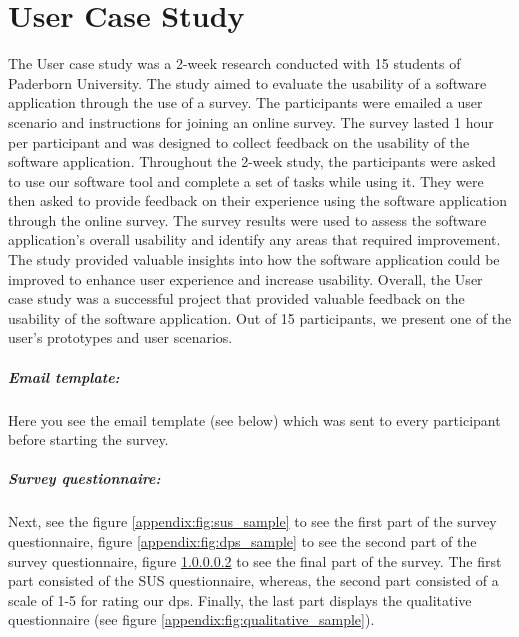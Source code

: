 \chapter{User Case Study}
\label{appendix:three:caseStudy}

\ifpdf
    \graphicspath{{Appendix3/Figs/}{Appendix3/Figs/}{Appendix3/Figs/}}
\else
    \graphicspath{{Appendix3/Figs/}{Appendix3/Figs/}}
\fi

The User case study was a 2-week research conducted with 15 students of Paderborn University. 
The study aimed to evaluate the usability of a software application through the use of a survey.
The participants were emailed a user scenario and instructions for joining an online survey. 
The survey lasted 1 hour per participant and was designed to collect feedback on the usability of the software application.
Throughout the 2-week study, the participants were asked to use our software tool and complete a set of tasks while using it. 
They were then asked to provide feedback on their experience using the software application through the online survey.
The survey results were used to assess the software application's overall usability and identify any areas that required improvement. 
The study provided valuable insights into how the software application could be improved to enhance user experience and increase usability. 
Overall, the User case study was a successful project that provided valuable feedback on the usability of the software application.
Out of 15 participants, we present one of the user's prototypes and user scenarios.

\paragraph{Email template:} Here you see the email template (see below) which was sent to every participant before starting the survey.

\paragraph{Survey questionnaire:} Next, see the figure \ref{appendix:fig:sus_sample} to see the first part of the survey questionnaire, figure \ref{appendix:fig:dps_sample} to see the second part of the survey questionnaire, figure \ref{} to see the final part of the survey.
The first part consisted of the SUS questionnaire, whereas, the second part consisted of a scale of 1-5 for rating our \ac{dp}s.
Finally, the last part displays the qualitative questionnaire (see figure \ref{appendix:fig:qualitative_sample}).

